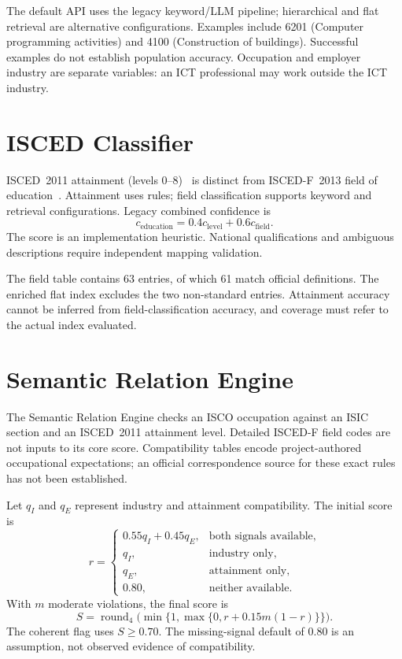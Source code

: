 The default API uses the legacy keyword/LLM pipeline; hierarchical and
flat retrieval are alternative configurations. Examples include
6201 (Computer programming activities) and 4100 (Construction of
buildings). Successful examples do not establish population accuracy.
Occupation and employer industry are separate variables: an ICT
professional may work outside the ICT industry.

\section{ISCED Classifier}
\label{sec:arch-isced}

ISCED~2011 attainment (levels 0--8)~\cite{unesco2012isced} is distinct
from ISCED-F~2013 field of education~\cite{unesco2015iscedf}.
Attainment uses rules; field classification supports keyword and
retrieval configurations. Legacy combined confidence is
\begin{equation}
 c_{\mathrm{education}}=0.4c_{\mathrm{level}}+0.6c_{\mathrm{field}}.
\end{equation}
The score is an implementation heuristic. National qualifications and
ambiguous descriptions require independent mapping validation.

The field table contains 63 entries, of which 61 match official
definitions. The enriched flat index excludes the two non-standard
entries. Attainment accuracy cannot be inferred from field-classification
accuracy, and coverage must refer to the actual index evaluated.

\section{Semantic Relation Engine}
\label{sec:arch-sre}

The Semantic Relation Engine checks an ISCO occupation against an ISIC
section and an ISCED~2011 attainment level. Detailed ISCED-F field codes
are not inputs to its core score. Compatibility tables encode
project-authored occupational expectations; an official correspondence
source for these exact rules has not been established.

Let $q_I$ and $q_E$ represent industry and attainment compatibility.
The initial score is
\begin{equation}
 r=\begin{cases}
 0.55q_I+0.45q_E,&\text{both signals available},\\
 q_I,&\text{industry only},\\
 q_E,&\text{attainment only},\\
 0.80,&\text{neither available}.
 \end{cases}
\end{equation}
With $m$ moderate violations, the final score is
\begin{equation}
 S=\operatorname{round}_{4}
 \bigl(\min\{1,\max\{0,r+0.15m(1-r)\}\}\bigr).
\end{equation}
The coherent flag uses $S\geq0.70$. The missing-signal default of 0.80 is
an assumption, not observed evidence of compatibility.

